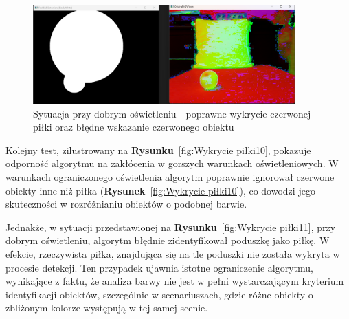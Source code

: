 \documentclass[a4paper,twoside,12pt]{book}
\begin{document}
\begin{figure}[h]
    \centering
    \includegraphics[width=0.9\textwidth]{Images/Porownanie/Binaryzacja/Zrzut ekranu 2025-01-02 193858.png}
    \caption{Sytuacja przy dobrym oświetleniu - poprawne wykrycie czerwonej piłki oraz błędne wskazanie czerwonego obiektu}
    \label{fig:Wykrycie piłki9}
\end{figure}

\newpage

Kolejny test, zilustrowany na \textbf{Rysunku}~\ref{fig:Wykrycie piłki10}, pokazuje odporność algorytmu na zakłócenia w gorszych warunkach oświetleniowych. W warunkach ograniczonego oświetlenia algorytm poprawnie ignorował czerwone obiekty inne niż piłka (\textbf{Rysunek}~\ref{fig:Wykrycie piłki10}), co dowodzi jego skuteczności w rozróżnianiu obiektów o podobnej barwie. 

Jednakże, w sytuacji przedstawionej na \textbf{Rysunku}~\ref{fig:Wykrycie piłki11}, przy dobrym oświetleniu, algorytm błędnie zidentyfikował poduszkę jako piłkę. W efekcie, rzeczywista piłka, znajdująca się na tle poduszki nie została wykryta w procesie detekcji. Ten przypadek ujawnia istotne ograniczenie algorytmu, wynikające z faktu, że analiza barwy nie jest w pełni wystarczającym kryterium identyfikacji obiektów, szczególnie w scenariuszach, gdzie różne obiekty o zbliżonym kolorze występują w tej samej scenie.
\end{document}
